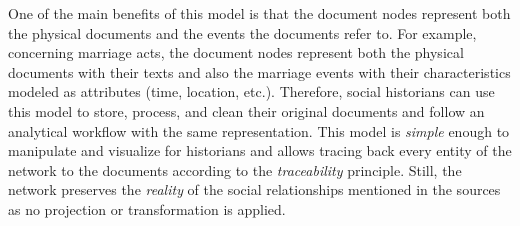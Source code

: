 One of the main benefits of this model is that the document nodes represent both the physical documents and the events the documents refer to.
For example, concerning marriage acts, the document nodes represent both the physical documents with their texts and also the marriage events with their characteristics modeled as attributes (time, location, etc.).
Therefore, social historians can use this model to store, process, and clean their original documents and follow an analytical workflow with the same representation.
This model is \textit{simple} enough to manipulate and visualize for historians and allows tracing back every entity of the network to the documents according to the \textit{traceability} principle.
Still, the network preserves the \textit{reality} of the social relationships mentioned in the sources as no projection or transformation is applied.





